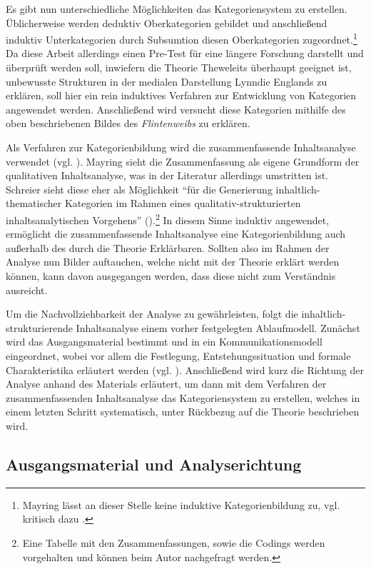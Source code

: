 \documentclass[12pt, titlepage=true, toc=bib]{scrartcl}
\begin{document}
\noindent Es gibt nun unterschiedliche Möglichkeiten das Kategoriensystem zu erstellen. Üblicherweise werden deduktiv Oberkategorien gebildet und anschließend induktiv Unterkategorien durch Subsumtion diesen Oberkategorien zugeordnet.\footnote{Mayring lässt an dieser Stelle keine induktive Kategorienbildung zu, vgl. kritisch dazu \textcite[Kap. II.4]{steigleder_strukturierende_2008}.} Da diese Arbeit allerdings einen Pre-Test für eine längere Forschung darstellt und überprüft werden soll, inwiefern die Theorie Theweleits überhaupt geeignet ist, unbewusste Strukturen in der medialen Darstellung Lynndie Englands zu erklären, soll hier ein rein induktives Verfahren zur Entwicklung von Kategorien angewendet werden. Anschließend wird versucht diese Kategorien mithilfe des oben beschriebenen Bildes des \textit{Flintenweibs} zu erklären.

Als Verfahren zur Kategorienbildung wird die zusammenfassende Inhaltsanalyse verwendet (vgl. \cite[Kap. 5.5.2]{mayring_qualitative_2010}). Mayring sieht die Zusammenfassung als eigene Grundform der qualitativen Inhaltsanalyse, was in der Literatur allerdings umstritten ist. Schreier sieht diese eher als Möglichkeit "`für die Generierung inhaltlich-thematischer Kategorien im Rahmen eines qualitativ-strukturierten inhaltsanalytischen Vorgehens"' (\cite[14]{schreier_varianten_2014}).\footnote{Eine Tabelle mit den Zusammenfassungen, sowie die Codings werden vorgehalten und können beim Autor nachgefragt werden.} In diesem Sinne induktiv angewendet, ermöglicht die zusammenfassende Inhaltsanalyse eine Kategorienbildung auch außerhalb des durch die Theorie Erklärbaren. Sollten also im Rahmen der Analyse nun Bilder auftauchen, welche nicht mit der Theorie erklärt werden können, kann davon ausgegangen werden, dass diese nicht zum Verständnis ausreicht.

Um die Nachvollziehbarkeit der Analyse zu gewährleisten, folgt die inhaltlich-strukturierende Inhaltsanalyse einem vorher festgelegten Ablaufmodell. Zunächst wird das Ausgangsmaterial bestimmt und in ein Kommunikationsmodell eingeordnet, wobei vor allem die Festlegung, Entstehungssituation und formale Charakteristika erläutert werden (vgl. \cite[52-53]{mayring_qualitative_2010}). Anschließend wird kurz die Richtung der Analyse anhand des Materials erläutert, um dann mit dem Verfahren der zusammenfassenden Inhaltsanalyse das Kategoriensystem zu erstellen, welches in einem letzten Schritt systematisch, unter Rückbezug auf die Theorie beschrieben wird.

\subsection{Ausgangsmaterial und Analyserichtung}
\end{document}
